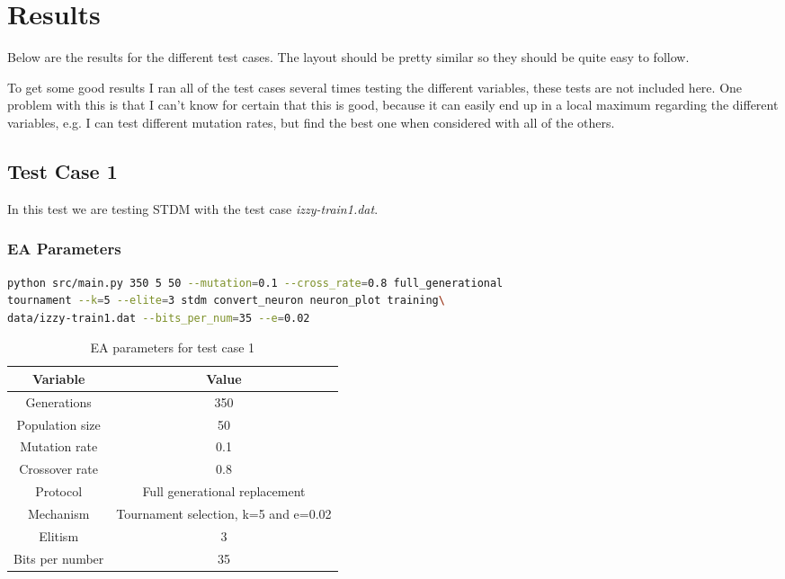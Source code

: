 \section{Results}\label{sec:results}
Below are the results for the different test cases. The layout should be pretty
similar so they should be quite easy to follow.

To get some good results I ran all of the test cases several times testing the
different variables, these tests are not included here. One problem with this is
that I can't know for certain that this is good, because it can easily end up in
a local maximum regarding the different variables, e.g. I can test different
mutation rates, but find the best one when considered with all of the others.

\subsection{Test Case 1}\label{sec:test-case-1}
In this test we are testing STDM with the test case
\textit{izzy-train1.dat}.
\subsubsection{EA Parameters}\label{sec:test-case-1-parameters}
\begin{lstlisting}[frame=single, language=bash, caption=Command-line to
replicate the results]
python src/main.py 350 5 50 --mutation=0.1 --cross_rate=0.8 full_generational
tournament --k=5 --elite=3 stdm convert_neuron neuron_plot training\
data/izzy-train1.dat --bits_per_num=35 --e=0.02
\end{lstlisting}
\begin{table}[h]
	\begin{tabular}{c c}
		Variable & Value \\
		\hline
		Generations & 350 \\
		\hline
		Population size & 50 \\
		\hline
		Mutation rate & 0.1 \\
		\hline
		Crossover rate & 0.8 \\
		\hline
		Protocol & Full generational replacement \\
		\hline
		Mechanism & Tournament selection, k=5 and e=0.02 \\
		\hline
		Elitism & 3 \\
		\hline
		Bits per number & 35 \\
	\end{tabular}
	\caption{EA parameters for test case 1}
\end{table}
